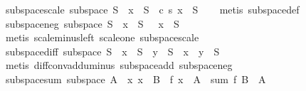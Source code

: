 \begin{isabellebody}
\endisatagproof
{\isafoldproof}%
%
\isadelimproof
\isanewline
%
\endisadelimproof
\isanewline
{}\isamarkupfalse%
\ subspace{\isacharunderscore}{\kern0pt}scale{\isacharcolon}{\kern0pt}\ {\isachardoublequoteopen}subspace\ S\ {\isasymLongrightarrow}\ x\ {\isasymin}\ S\ {\isasymLongrightarrow}\ c\ {\isacharasterisk}{\kern0pt}s\ x\ {\isasymin}\ S{\isachardoublequoteclose}\isanewline
%
\isadelimproof
\ \ %
\endisadelimproof
%
\isatagproof
{}\isamarkupfalse%
\ {\isacharparenleft}{\kern0pt}metis\ subspace{\isacharunderscore}{\kern0pt}def{\isacharparenright}{\kern0pt}%
\endisatagproof
{\isafoldproof}%
%
\isadelimproof
\isanewline
%
\endisadelimproof
\isanewline
{}\isamarkupfalse%
\ subspace{\isacharunderscore}{\kern0pt}neg{\isacharcolon}{\kern0pt}\ {\isachardoublequoteopen}subspace\ S\ {\isasymLongrightarrow}\ x\ {\isasymin}\ S\ {\isasymLongrightarrow}\ {\isacharminus}{\kern0pt}\ x\ {\isasymin}\ S{\isachardoublequoteclose}\isanewline
%
\isadelimproof
\ \ %
\endisadelimproof
%
\isatagproof
{}\isamarkupfalse%
\ {\isacharparenleft}{\kern0pt}metis\ scale{\isacharunderscore}{\kern0pt}minus{\isacharunderscore}{\kern0pt}left\ scale{\isacharunderscore}{\kern0pt}one\ subspace{\isacharunderscore}{\kern0pt}scale{\isacharparenright}{\kern0pt}%
\endisatagproof
{\isafoldproof}%
%
\isadelimproof
\isanewline
%
\endisadelimproof
\isanewline
{}\isamarkupfalse%
\ subspace{\isacharunderscore}{\kern0pt}diff{\isacharcolon}{\kern0pt}\ {\isachardoublequoteopen}subspace\ S\ {\isasymLongrightarrow}\ x\ {\isasymin}\ S\ {\isasymLongrightarrow}\ y\ {\isasymin}\ S\ {\isasymLongrightarrow}\ x\ {\isacharminus}{\kern0pt}\ y\ {\isasymin}\ S{\isachardoublequoteclose}\isanewline
%
\isadelimproof
\ \ %
\endisadelimproof
%
\isatagproof
{}\isamarkupfalse%
\ {\isacharparenleft}{\kern0pt}metis\ diff{\isacharunderscore}{\kern0pt}conv{\isacharunderscore}{\kern0pt}add{\isacharunderscore}{\kern0pt}uminus\ subspace{\isacharunderscore}{\kern0pt}add\ subspace{\isacharunderscore}{\kern0pt}neg{\isacharparenright}{\kern0pt}%
\endisatagproof
{\isafoldproof}%
%
\isadelimproof
\isanewline
%
\endisadelimproof
\isanewline
{}\isamarkupfalse%
\ subspace{\isacharunderscore}{\kern0pt}sum{\isacharcolon}{\kern0pt}\ {\isachardoublequoteopen}subspace\ A\ {\isasymLongrightarrow}\ {\isacharparenleft}{\kern0pt}{\isasymAnd}x{\isachardot}{\kern0pt}\ x\ {\isasymin}\ B\ {\isasymLongrightarrow}\ f\ x\ {\isasymin}\ A{\isacharparenright}{\kern0pt}\ {\isasymLongrightarrow}\ sum\ f\ B\ {\isasymin}\ A{\isachardoublequoteclose}\isanewline

\end{isabellebody}
